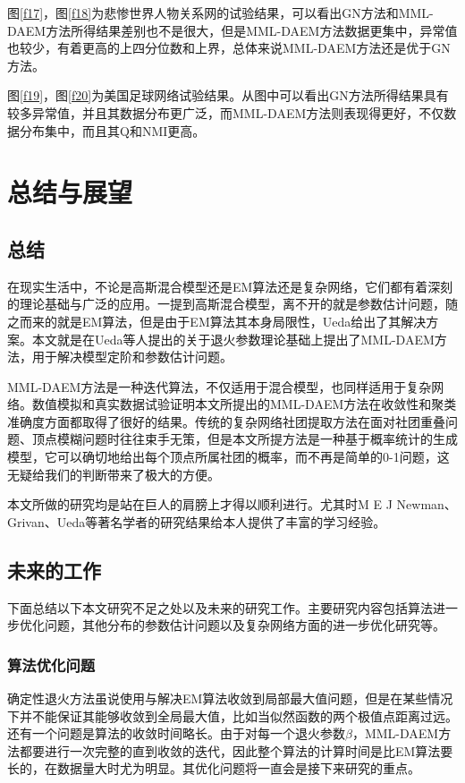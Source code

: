 \documentclass[a4paper,12pt,openany,oneside,utf-8]{ctexbook}
\newcommand{\xiaowuhao}{\fontsize{9pt}{\baselineskip}\selectfont}
\begin{document}
    图\ref{f17}，图\ref{f18}为悲惨世界人物关系网的试验结果，可以看出GN方法和MML-DAEM方法所得结果差别也不是很大，但是MML-DAEM方法数据更集中，异常值也较少，有着更高的上四分位数和上界，总体来说MML-DAEM方法还是优于GN方法。
    
    图\ref{f19}，图\ref{f20}为美国足球网络试验结果。从图中可以看出GN方法所得结果具有较多异常值，并且其数据分布更广泛，而MML-DAEM方法则表现得更好，不仅数据分布集中，而且其Q和NMI更高。
    
    
	\chapter[总结与展望]{总结与展望}\fancyhead[C]{\xiaowuhao}
	\section{总结}
	在现实生活中，不论是高斯混合模型还是EM算法还是复杂网络，它们都有着深刻的理论基础与广泛的应用。一提到高斯混合模型，离不开的就是参数估计问题，随之而来的就是EM算法，但是由于EM算法其本身局限性，Ueda\cite{ref21}给出了其解决方案。本文就是在Ueda等人提出的关于退火参数理论基础上提出了MML-DAEM方法，用于解决模型定阶和参数估计问题。
	
	MML-DAEM方法是一种迭代算法，不仅适用于混合模型，也同样适用于复杂网络。数值模拟和真实数据试验证明本文所提出的MML-DAEM方法在收敛性和聚类准确度方面都取得了很好的结果。传统的复杂网络社团提取方法在面对社团重叠问题、顶点模糊问题时往往束手无策，但是本文所提方法是一种基于概率统计的生成模型，它可以确切地给出每个顶点所属社团的概率，而不再是简单的0-1问题，这无疑给我们的判断带来了极大的方便。
	
	本文所做的研究均是站在巨人的肩膀上才得以顺利进行。尤其时M E J Newman、Grivan、Ueda等著名学者的研究结果给本人提供了丰富的学习经验。
	
	\section{未来的工作}
	下面总结以下本文研究不足之处以及未来的研究工作。主要研究内容包括算法进一步优化问题，其他分布的参数估计问题以及复杂网络方面的进一步优化研究等。
	
	
	\subsection{算法优化问题}
	确定性退火方法虽说使用与解决EM算法收敛到局部最大值问题，但是在某些情况下并不能保证其能够收敛到全局最大值，比如当似然函数的两个极值点距离过远。还有一个问题是算法的收敛时间略长。由于对每一个退火参数$\beta$，MML-DAEM方法都要进行一次完整的直到收敛的迭代，因此整个算法的计算时间是比EM算法要长的，在数据量大时尤为明显。其优化问题将一直会是接下来研究的重点。
\end{document}
